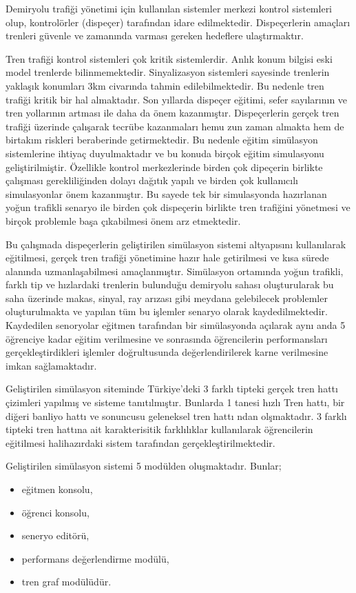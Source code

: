 \documentclass[conference]{IEEEtran}
\begin{document}
Demiryolu trafiği yönetimi için kullanılan sistemler merkezi kontrol sistemleri olup, kontrolörler (dispeçer) tarafından idare edilmektedir.  Dispeçerlerin amaçları trenleri güvenle ve zamanında varması gereken hedeflere ulaştırmaktır.


Tren trafiği kontrol sistemleri çok kritik sistemlerdir. Anlık konum bilgisi eski model trenlerde bilinmemektedir. Sinyalizasyon sistemleri sayesinde trenlerin yaklaşık konumları 3km civarında tahmin edilebilmektedir. Bu nedenle tren trafiği kritik bir hal almaktadır. Son yıllarda dispeçer eğitimi, sefer sayılarının ve tren yollarının artması ile daha da önem kazanmıştır. Dispeçerlerin gerçek tren trafiği üzerinde çalışarak tecrübe kazanmaları hemu zun zaman almakta hem de birtakım riskleri beraberinde getirmektedir. Bu nedenle eğitim simülasyon sistemlerine ihtiyaç duyulmaktadır ve bu konuda birçok eğitim simulasyonu geliştirilmiştir. Özellikle kontrol merkezlerinde birden çok dipeçerin birlikte çalışması gerekliliğinden dolayı dağıtık yapılı ve birden çok kullanıcılı simulasyonlar önem kazanmıştır. Bu sayede tek bir simulasyonda hazırlanan yoğun trafikli senaryo ile birden çok dispeçerin birlikte tren trafiğini yönetmesi ve birçok problemle başa çıkabilmesi önem arz etmektedir. 


Bu çalışmada dispeçerlerin geliştirilen simülasyon sistemi altyapısını kullanılarak eğitilmesi, gerçek tren trafiği yönetimine hazır hale getirilmesi ve kısa sürede alanında uzmanlaşabilmesi amaçlanmıştır. Simülasyon ortamında yoğun trafikli, farklı tip ve hızlardaki trenlerin bulunduğu demiryolu sahası oluşturularak bu saha üzerinde makas, sinyal, ray arızası gibi meydana gelebilecek problemler oluşturulmakta ve yapılan tüm bu işlemler senaryo olarak kaydedilmektedir. Kaydedilen senoryolar eğitmen tarafından bir simülasyonda açılarak aynı anda 5 öğrenciye kadar eğitim verilmesine ve sonrasında öğrencilerin performansları gerçekleştirdikleri işlemler doğrultusunda değerlendirilerek karne verilmesine imkan sağlamaktadır.


Geliştirilen simülasyon siteminde  Türkiye'deki 3 farklı tipteki gerçek tren hattı çizimleri yapılmış ve sisteme tanıtılmıştır. Bunlarda 1 tanesi hızlı Tren hattı, bir diğeri banliyo hattı ve sonuncusu geleneksel tren hattı ndan olşmaktadır. 3 farklı tipteki tren hattına ait karakterisitik farklılıklar kullanılarak öğrencilerin eğitilmesi halihazırdaki sistem tarafından gerçekleştirilmektedir.


Geliştirilen simülasyon sistemi 5 modülden oluşmaktadır. 
Bunlar; 
\begin{itemize}
\item eğitmen konsolu,
\item öğrenci konsolu, 
\item seneryo editörü,
\item performans değerlendirme modülü,
\item tren graf modülüdür. 
\end{itemize}
\end{document}
